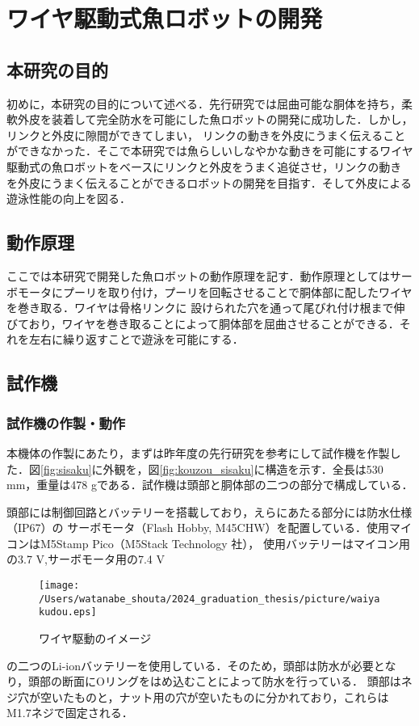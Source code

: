 \newpage
\section{ワイヤ駆動式魚ロボットの開発}
\subsection{本研究の目的}
初めに，本研究の目的について述べる．先行研究では屈曲可能な胴体を持ち，柔軟外皮を装着して完全防水を可能にした魚ロボットの開発に成功した．しかし，リンクと外皮に隙間ができてしまい，
リンクの動きを外皮にうまく伝えることができなかった．そこで本研究では魚らしいしなやかな動きを可能にするワイヤ駆動式の魚ロボットをベースにリンクと外皮をうまく追従させ，リンクの動き
を外皮にうまく伝えることができるロボットの開発を目指す．そして外皮による遊泳性能の向上を図る．

\subsection{動作原理}
ここでは本研究で開発した魚ロボットの動作原理を記す．動作原理としてはサーボモータにプーリを取り付け，プーリを回転させることで胴体部に配したワイヤを巻き取る．ワイヤは骨格リンクに
設けられた穴を通って尾びれ付け根まで伸びており，ワイヤを巻き取ることによって胴体部を屈曲させることができる．それを左右に繰り返すことで遊泳を可能にする．

\subsection{試作機}
\subsubsection{試作機の作製・動作}
本機体の作製にあたり，まずは昨年度の先行研究を参考にして試作機を作製した．図\ref{fig:sisaku}に外観を，図\ref{fig:kouzou_sisaku}に構造を示す．全長は530 mm，重量は478 gである．試作機は頭部と胴体部の二つの部分で構成している．

頭部には制御回路とバッテリーを搭載しており，えらにあたる部分には防水仕様（IP67）の サーボモータ（Flash Hobby, M45CHW）を配置している．使用マイコンはM5Stamp Pico（M5Stack Technology 社），
使用バッテリーはマイコン用の3.7 V,サーボモータ用の7.4 V
\begin{figure}[H]
   \centering
   \texttt{[image: /Users/watanabe\_shouta/2024\_graduation\_thesis/picture/waiyakudou.eps]}
   \caption{ワイヤ駆動のイメージ}
   \label{fig:waiyakudou}
\end{figure}
\noindent の二つのLi-ionバッテリーを使用している．そのため，頭部は防水が必要となり，頭部の断面にOリングをはめ込むことによって防水を行っている．
頭部はネジ穴が空いたものと，ナット用の穴が空いたものに分かれており，これらはM1.7ネジで固定される．

